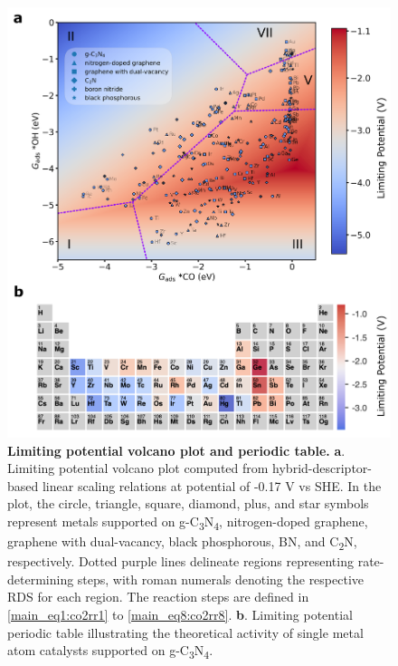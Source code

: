 \documentclass[a4paper, 12pt, titlepage]{article}
\begin{document}
\begin{figure}[htbp]
    \centering
    \includegraphics[width=\textwidth]{main_fig3_volcano.png}
    \caption{\textbf{Limiting potential volcano plot and periodic table.}
    \textbf{a}. Limiting potential volcano plot computed from hybrid-descriptor-based
    linear scaling relations at potential of -0.17 V vs SHE.
    In the plot, the circle, triangle, square, diamond, plus, and star symbols represent
    metals supported on g-C\textsubscript{3}N\textsubscript{4}, nitrogen-doped graphene,
    graphene with dual-vacancy, black phosphorous, BN, and C\textsubscript{2}N, respectively.
    Dotted purple lines delineate regions representing rate-determining steps,
    with roman numerals denoting the respective RDS for each region.
    The reaction steps are defined in \cref{main_eq1:co2rr1} to \cref{main_eq8:co2rr8}.
    \textbf{b}. Limiting potential periodic table illustrating the theoretical activity of
    single metal atom catalysts supported on g-C\textsubscript{3}N\textsubscript{4}.}
    \label{main_fig3:volcano}
\end{figure}
\end{document}
